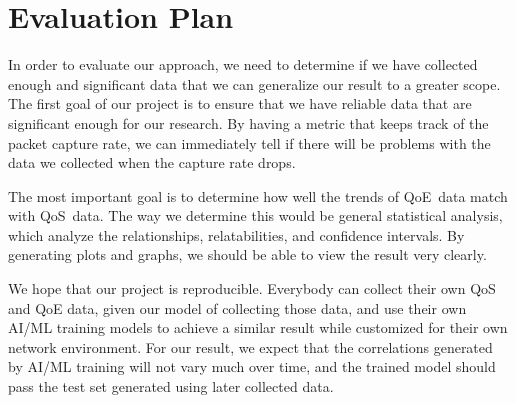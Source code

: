 \section{Evaluation Plan}\label{evaluation}
    In order to evaluate our approach, we need to determine if we have collected enough and significant data that we can generalize our result to a greater scope. The first goal of our project is to ensure that we have reliable data that are significant enough for our research. By having a metric that keeps track of the packet capture rate, we can immediately tell if there will be problems with the data we collected when the capture rate drops.

    The most important goal is to determine how well the trends of QoE~data match with QoS~data. The way we determine this would be general statistical analysis, which analyze the relationships, relatabilities, and confidence intervals. By generating plots and graphs, we should be able to view the result very clearly. 

    We hope that our project is reproducible. Everybody can collect their own QoS and QoE data, given our model of collecting those data, and use their own AI/ML training models to achieve a similar result while customized for their own network environment. For our result, we expect that the correlations generated by AI/ML training will not vary much over time, and the trained model should pass the test set generated using later collected data. 
